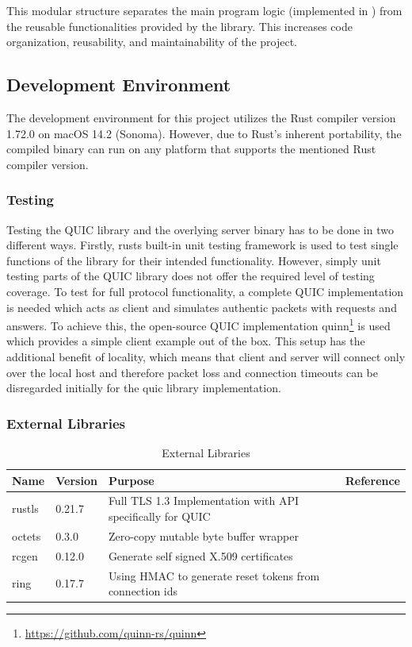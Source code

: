 This modular structure separates the main program logic (implemented in ) from the reusable functionalities provided by the  library. This increases code organization, reusability, and maintainability of the project.

\subsection{Development Environment}

The development environment for this project utilizes the Rust compiler version 1.72.0 on macOS 14.2 (Sonoma). However, due to Rust's inherent portability, the compiled binary can run on any platform that supports the mentioned Rust compiler version.

\subsubsection{Testing}

Testing the QUIC library and the overlying server binary has to be done in two different ways. Firstly, rusts built-in unit testing framework is used to test single functions of the library for their intended functionality. However, simply unit testing parts of the QUIC library does not offer the required level of testing coverage. To test for full protocol functionality, a complete QUIC implementation is needed which acts as client and simulates authentic packets with requests and answers. To achieve this, the open-source QUIC implementation quinn\footnote{\url{https://github.com/quinn-rs/quinn}} is used which provides a simple client example out of the box. This setup has the additional benefit of locality, which means that client and server will connect only over the local host and therefore packet loss and connection timeouts can be disregarded initially for the quic library implementation.

\subsubsection{External Libraries} \label{ext_libs}

\begin{table}[H]
\begin{center}
    \begin{tabular}{| l | l | p{100mm} | l |}
    \hline
    \textbf{Name} & \textbf{Version} & \textbf{Purpose} & \textbf{Reference} \\ \hline
    rustls & 0.21.7 & Full TLS 1.3 Implementation with API specifically for QUIC & \cite{rustls} \\ \hline
    octets & 0.3.0 & Zero-copy mutable byte buffer wrapper & \cite{octets} \\ \hline
    rcgen & 0.12.0 & Generate self signed X.509 certificates & \cite{rcgen} \\ \hline
    ring & 0.17.7 & Using HMAC to generate reset tokens from connection ids & \cite{ring} \\ \hline
    \end{tabular}
\end{center}
\caption{External Libraries}
\label{ext_libs}
\end{table}

